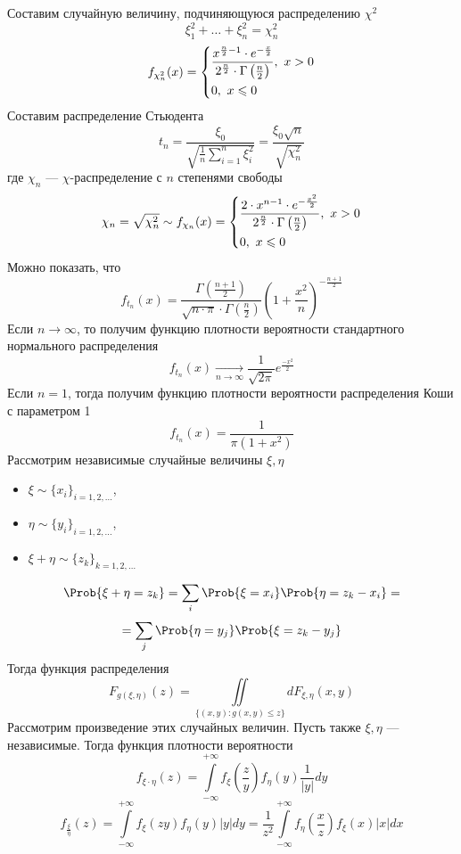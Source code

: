 Составим случайную величину, подчиняющуюся распределению $\chi^2$
\[
	\xi_1^2 + \ldots + \xi_n^2 = \chi_n^2
\]
\[
	f_{\chi_n^2} (x) = \begin{dcases*}
	\frac{x^{\frac{n}{2}-1} \cdot e^{-\frac{x}{2}} }{2^{\frac{n}{2}} \cdot \Gamma \left( \frac{n}{2} \right)}, \ x > 0 \\
	0, \ x \leqslant 0
	\end{dcases*}
\]
Составим распределение Стьюдента
\[
	t_n = \frac{\xi_0}{\sqrt{\frac{1}{n} \sum\limits_{i=1}^{n} \xi_i^2}} = \frac{\xi_0 \sqrt{n}}{\sqrt{\chi_n^2}} 
\]
где $\chi_n$ --- $\chi$-распределение с $n$ степенями свободы
\[
	\chi_n = \sqrt{\chi_n^2} \sim f_{\chi_n} (x) = \begin{dcases*}
	\frac{2 \cdot x^{n-1} \cdot e^{-\frac{x^2}{2}}}{2^{\frac{n}{2}} \cdot \Gamma \left( \frac{n}{2} \right)}, \ x > 0\\
	0, \ x \leqslant 0
	\end{dcases*}
\]
Можно показать, что
\[
	f_{t_n} (x) = \frac{\Gamma \left( \frac{n + 1}{2} \right)}{\sqrt{n \cdot \pi} \cdot \Gamma \left( \frac{n}{2} \right)} \left( 1 + \frac{x^2}{n} \right)^{-\frac{n+1}{2}}
\]
Если $n \to \infty$, то получим функцию плотности вероятности стандартного нормального распределения
\[
	f_{t_n} (x) \underset{n \to \infty}{\rightarrow} \frac{1}{\sqrt{2\pi}} e^{\frac{-x^2}{2}}
\]
Если $n = 1$, тогда получим функцию плотности вероятности распределения Коши с параметром 1
\[
	f_{t_n} (x) = \frac{1}{\pi (1 + x^2)}
\]
Рассмотрим независимые случайные величины $\xi, \eta$
\begin{itemize}
	\item $\xi \sim {\{ x_i \}}_{i = 1, 2, \ldots}$,
	\item $\eta \sim {\{ y_i \}}_{i = 1, 2, \ldots}$,
	\item $\xi + \eta \sim {\{ z_k \}}_{k = 1, 2, \ldots}$
\end{itemize}
\[
	\Prob \{ \xi + \eta = z_k \} = \sum\limits_{i} \Prob \{ \xi = x_i \} \Prob \{ \eta = z_k - x_i \} = 
\]
\[
	= \sum\limits_{j} \Prob \{ \eta = y_j \} \Prob \{ \xi = z_k - y_j \}
\]
Тогда функция распределения
\[
	F_{g(\xi, \eta)} (z) = \iint\limits_{\{ (x, y) : g(x, y) \leqslant z \}} dF_{\xi, \eta} (x, y)
\]
Рассмотрим произведение этих случайных величин. Пусть также $\xi, \eta$ --- независимые. Тогда функция плотности вероятности
\[
	f_{\xi \cdot \eta} (z) = \int\limits_{-\infty}^{+\infty} f_{\xi} (\frac{z}{y}) f_{\eta} (y) \frac{1}{|y|} dy
\]
\[
	f_{\frac{\xi}{\eta}} (z) = \int\limits_{-\infty}^{+\infty} f_{\xi} (zy) f_{\eta} (y) |y| dy = \frac{1}{z^2} \int\limits_{-\infty}^{+\infty} f_{\eta} \left(\frac{x}{z}\right) f_{\xi} (x) |x| dx
\]

